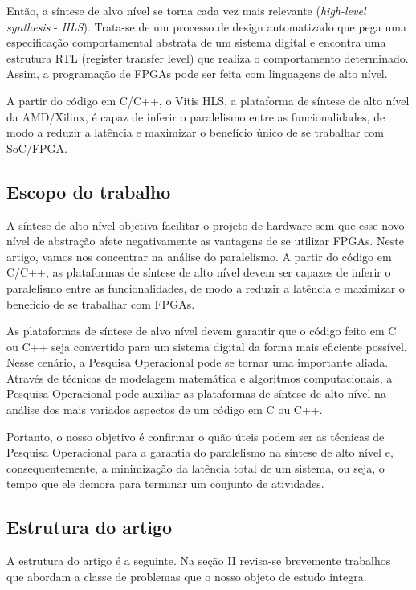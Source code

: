 \documentclass[journal]{IEEEtran}
\begin{document}
        Então, a síntese de alvo nível se torna cada vez mais relevante (\textit{high-level synthesis} - \textit{HLS}). Trata-se de um processo de design automatizado que pega uma especificação comportamental abstrata de um sistema digital e encontra uma estrutura RTL (register transfer level) que realiza o comportamento determinado. Assim, a programação de FPGAs pode ser feita com linguagens de alto nível.

        A partir do código em C/C++, o Vitis HLS, a plataforma de síntese de alto nível da AMD/Xilinx, é capaz de inferir o paralelismo entre as funcionalidades, de modo a reduzir a latência e maximizar o benefício único de se trabalhar com SoC/FPGA.
        
        \subsection{Escopo do trabalho}
        A síntese de alto nível objetiva facilitar o projeto de hardware sem que esse novo nível de abstração afete negativamente as vantagens de se utilizar FPGAs. Neste artigo, vamos nos concentrar na análise do paralelismo. A partir do código em C/C++, as plataformas de síntese de alto nível devem ser capazes de inferir o paralelismo entre as funcionalidades, de modo a reduzir a latência e maximizar o benefício de se trabalhar com FPGAs.
                
        As plataformas de síntese de alvo nível devem garantir que o código feito em C ou C++ seja convertido para um sistema digital da forma mais eficiente possível. Nesse cenário, a Pesquisa Operacional pode se tornar uma importante aliada. Através de técnicas de modelagem matemática e algoritmos computacionais, a Pesquisa Operacional pode auxiliar as plataformas de síntese de alto nível na análise dos mais variados aspectos de um código em C ou C++.

        Portanto, o nosso objetivo é confirmar o quão úteis podem ser as técnicas de Pesquisa Operacional para a garantia do paralelismo na síntese de alto nível e, consequentemente, a minimização da latência total de um sistema, ou seja, o tempo que ele demora para terminar um conjunto de atividades.

        \subsection{Estrutura do artigo}

        A estrutura do artigo é a seguinte. Na seção II revisa-se brevemente trabalhos que abordam a  classe de problemas que o nosso objeto de estudo integra.
        
\end{document}
